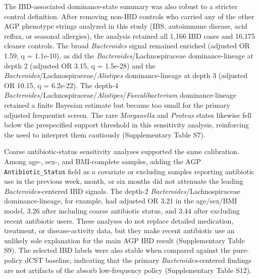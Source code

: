 \documentclass[
  11pt,
]{article}
\newcommand{\taxon}[1]{\emph{#1}}
\newcommand{\dcstsep}{/\allowbreak}
\begin{document}
The IBD-associated dominance-state summary was also robust to a stricter
control definition. After
removing non-IBD controls who carried any of the other AGP phenotype
strings analyzed in this study (IBS, autoimmune disease, acid reflux, or
seasonal allergies), the analysis retained all 1,166 IBD cases and 16,175
cleaner controls. The broad \taxon{Bacteroides} signal remained enriched
(adjusted OR 1.59, q = 1.1e-10), as did the
\taxon{Bacteroides}\dcstsep Lachnospiraceae dominance-lineage at depth 2
(adjusted OR 3.15, q = 1.5e-28) and the
\taxon{Bacteroides}\dcstsep Lachnospiraceae\dcstsep\taxon{Alistipes}
dominance-lineage at depth 3 (adjusted OR 10.15, q = 6.2e-22). The
depth-4
\taxon{Bacteroides}\dcstsep Lachnospiraceae\dcstsep\taxon{Alistipes}\dcstsep\taxon{Faecalibacterium}
dominance-lineage retained a finite Bayesian estimate but became too small for the
primary adjusted frequentist screen. The rare \taxon{Morganella}
and \taxon{Proteus} states likewise fell below the prespecified support
threshold in this sensitivity analysis, reinforcing the need to interpret
them cautiously (Supplementary Table S7).

Coarse antibiotic-status sensitivity analyses supported the same
calibration. Among age-, sex-, and BMI-complete samples, adding the AGP
\texttt{Antibiotic\_Status} field as a covariate or excluding samples
reporting antibiotic use in the previous week, month, or six months did
not attenuate the leading \taxon{Bacteroides}-centered IBD signals. The
depth-2 \taxon{Bacteroides}\dcstsep Lachnospiraceae dominance-lineage,
for example, had adjusted OR 3.21 in the age/sex/BMI model, 3.26 after
including coarse antibiotic status, and 3.44 after excluding recent
antibiotic users. These analyses do not replace detailed medication,
treatment, or disease-activity data, but they make recent antibiotic use
an unlikely sole explanation for the main AGP IBD result
(Supplementary Table S9). The selected IBD labels were also stable when
compared against the pure-policy dCST baseline, indicating that the
primary \taxon{Bacteroides}-centered findings are not artifacts of the
absorb low-frequency policy (Supplementary Table S12).
\end{document}

